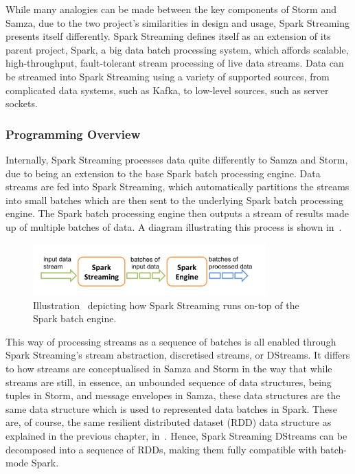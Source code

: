 While many analogies can be made between the key components of Storm and Samza, due to the two project's similarities in design and
usage, Spark Streaming presents itself differently. Spark Streaming defines itself as an extension of its parent project,
Spark, a big data batch processing system, which affords scalable, high-throughput, fault-tolerant stream processing of
live data streams. Data can be streamed into Spark Streaming using a variety of supported sources, from complicated data
systems, such as Kafka, to low-level sources, such as server sockets.

\subsubsection{Programming Overview}

Internally, Spark Streaming processes data quite differently to Samza and Storm, due to being an extension to the base
Spark batch processing engine. Data streams are fed into Spark Streaming, which automatically partitions the streams into
small batches which are then sent to the underlying Spark batch processing engine. The Spark batch processing engine then
outputs a stream of results made up of multiple batches of data. A diagram illustrating this process is shown in~.

\begin{figure}[H]
  \centering
  \includegraphics[width=0.8\textwidth]{includes/figures/fig_spark_layout}
  \caption{Illustration~\cite{Spark_doc_fig} depicting how Spark Streaming runs on-top of the Spark batch engine.}
  \label{fig:spark_stream_batch}
\end{figure}

This way of processing streams as a sequence of batches is all enabled through Spark Streaming's stream abstraction,
discretised streams, or DStreams. It differs to how streams are conceptualised in Samza and Storm in the way that while
streams are still, in essence, an unbounded sequence of data structures, being tuples in Storm, and message envelopes in
Samza, these data structures are the same data structure which is used to represented data batches in Spark. These are,
of course, the same resilient distributed dataset (RDD) data structure as explained in the previous chapter, in~.
Hence, Spark Streaming DStreams can be decomposed into a sequence of RDDs, making them fully compatible with batch-mode Spark.

